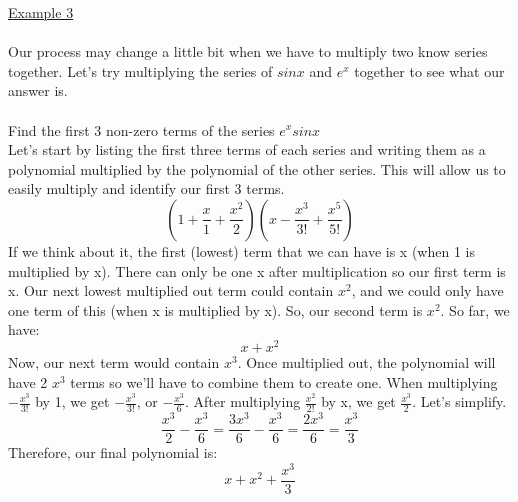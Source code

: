 \documentclass[a4paper,openright, 14pt]{article}
\begin{document}
\underline{Example 3}\\\\
Our process may change a little bit when we have to multiply two know series together. Let's try multiplying the series of $sinx$ and $e^x$ together to see what our answer is.\\\\
Find the first 3 non-zero terms of the series $e^xsinx$\\
Let's start by listing the first three terms of each series and writing them as a polynomial multiplied by the polynomial of the other series. This will allow us to easily multiply and identify our first 3 terms.
$$(1+\frac{x}{1}+\frac{x^2}{2})(x-\frac{x^3}{3!}+\frac{x^5}{5!})$$
If we think about it, the first (lowest) term that we can have is x (when 1 is multiplied by x). There can only be one x after multiplication so our first term is x. Our next lowest multiplied out term could contain $x^2$, and we could only have one term of this (when x is multiplied by x). So, our second term is $x^2$. So far, we have:
$$x+x^2$$
Now, our next term would contain $x^3$. Once multiplied out, the polynomial will have 2 $x^3$ terms so we'll have to combine them to create one. When multiplying $-\frac{x^3}{3!}$ by 1, we get $-\frac{x^3}{3!}$, or $-\frac{x^3}{6}$. After multiplying $\frac{x^2}{2!}$ by x, we get $\frac{x^3}{2}$. Let's simplify.
$$\frac{x^3}{2}-\frac{x^3}{6}=\frac{3x^3}{6}-\frac{x^3}{6}=\frac{2x^3}{6}=\frac{x^3}{3}$$
Therefore, our final polynomial is:
$$x+x^2+\frac{x^3}{3}$$
\end{document}
